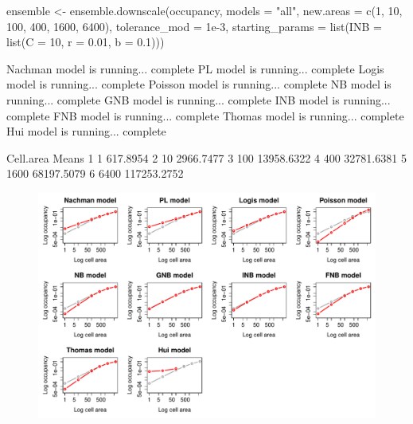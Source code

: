 \documentclass{article}[12pt, a4paper]
\begin{document}
\begin{Schunk}
\begin{Sinput}
ensemble <- ensemble.downscale(occupancy,
                               models = "all",
                               new.areas = c(1, 10, 100, 400, 1600, 6400),
                               tolerance_mod = 1e-3,
                               starting_params = list(INB = list(C = 10, 
                                                                 r = 0.01, 
                                                                 b = 0.1)))
\end{Sinput}
\begin{Soutput}
Nachman model is running...  complete 
PL model is running...  complete 
Logis model is running...  complete 
Poisson model is running...  complete 
NB model is running...  complete 
GNB model is running...  complete 
INB model is running...  complete 
FNB model is running...  complete 
Thomas model is running...  complete 
Hui model is running...  complete 





\end{Soutput}


\begin{Soutput}
  Cell.area       Means
1         1    617.8954
2        10   2966.7477
3       100  13958.6322
4       400  32781.6381
5      1600  68197.5079
6      6400 117253.2752
\end{Soutput}
\end{Schunk}

\begin{figure}[!ht]
\centering
\includegraphics[width=\linewidth]{Downscaling-downscale36}
\end{figure}
\end{document}
